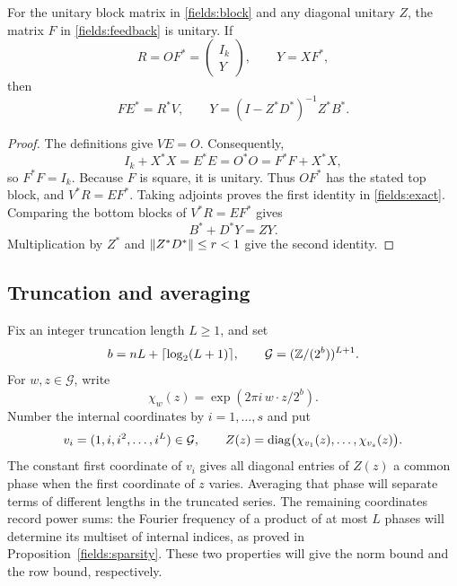 \begin{lemma}\label{fields:unitary}
For the unitary block matrix in \eqref{fields:block} and any diagonal
unitary $Z$, the matrix $F$ in \eqref{fields:feedback} is unitary.
If
\begin{equation}\label{fields:R}
 R=OF^*=\begin{pmatrix}I_k\\ Y\end{pmatrix},
 \qquad Y=XF^*,
\end{equation}
then
\begin{equation}\label{fields:exact}
 FE^*=R^*V,
 \qquad
 Y=(I-Z^*D^*)^{-1}Z^*B^*.
\end{equation}
\end{lemma}

\begin{proof}
The definitions give $VE=O$. Consequently,
\[
 I_k+X^*X=E^*E=O^*O=F^*F+X^*X,
\]
so $F^*F=I_k$. Because $F$ is square, it is unitary. Thus $OF^*$ has
the stated top block, and $V^*R=EF^*$. Taking adjoints proves the first
identity in \eqref{fields:exact}. Comparing the bottom blocks of
$V^*R=EF^*$ gives
\[
 B^*+D^*Y=ZY.
\]
Multiplication by $Z^*$ and $\lVert Z^*D^*\rVert\le r<1$ give the second identity.
\end{proof}

\subsection{Truncation and averaging}

Fix an integer truncation length $L\ge1$, and set
\begin{equation}\label{fields:parameters}
 b=nL+\lceil\log_2(L+1)\rceil,\qquad
 \mathcal G=(\mathbb Z/(2^b))^{L+1}.
\end{equation}
For $w,z\in\mathcal G$, write
\[
 \chi_w(z)=\exp(2\pi i\,w\cdot z/2^b).
\]
Number the internal coordinates by $i=1,\ldots,s$ and put
\begin{equation}\label{fields:phases}
 v_i=(1,i,i^2,\ldots,i^L)\in\mathcal G,
 \qquad Z(z)=\operatorname{diag}\bigl(\chi_{v_1}(z),\ldots,\chi_{v_s}(z)\bigr).
\end{equation}
The constant first coordinate of $v_i$ gives all diagonal entries of $Z(z)$
a common phase when the first coordinate of $z$ varies. Averaging that phase
will separate terms of different lengths in the truncated series. The
remaining coordinates record power sums: the Fourier frequency of a product
of at most $L$ phases will determine its multiset of internal indices, as proved in
Proposition~\ref{fields:sparsity}. These two properties will give the norm
bound and the row bound, respectively.


